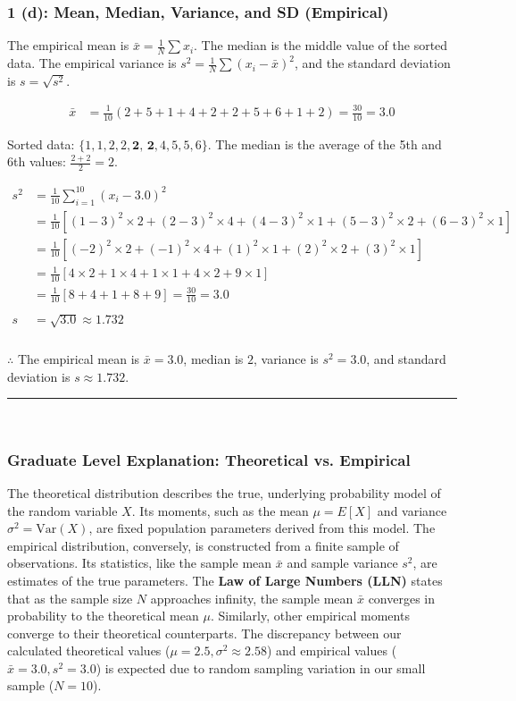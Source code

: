 \documentclass{article}
\begin{document}
\subsubsection*{1 (d): Mean, Median, Variance, and SD (Empirical)}
\parbox{\textwidth}{The empirical mean is $\bar{x} = \frac{1}{N}\sum x_i$. The median is the middle value of the sorted data. The empirical variance is $s^2 = \frac{1}{N}\sum(x_i - \bar{x})^2$, and the standard deviation is $s = \sqrt{s^2}$.}
\begin{align*}
\bar{x} &= \frac{1}{10}(2+5+1+4+2+2+5+6+1+2) = \frac{30}{10} = 3.0
\end{align*}
\parbox{\textwidth}{Sorted data: $\{1, 1, 2, 2, \textbf{2, 2}, 4, 5, 5, 6\}$. The median is the average of the 5th and 6th values: $\frac{2+2}{2} = 2$.}
\begin{align*}
s^2 &= \frac{1}{10}\sum_{i=1}^{10}(x_i - 3.0)^2 \\
&= \frac{1}{10}\left[(1-3)^2 \times 2 + (2-3)^2 \times 4 + (4-3)^2 \times 1 + (5-3)^2 \times 2 + (6-3)^2 \times 1\right] \\
&= \frac{1}{10}\left[(-2)^2 \times 2 + (-1)^2 \times 4 + (1)^2 \times 1 + (2)^2 \times 2 + (3)^2 \times 1\right] \\
&= \frac{1}{10}\left[4 \times 2 + 1 \times 4 + 1 \times 1 + 4 \times 2 + 9 \times 1\right] \\
&= \frac{1}{10}\left[8 + 4 + 1 + 8 + 9\right] = \frac{30}{10} = 3.0 \\
\\
s &= \sqrt{3.0} \approx 1.732
\end{align*}
\subsubsection*{\normalfont}{$\therefore$ The empirical mean is $\bar{x}=3.0$, median is $2$, variance is $s^2=3.0$, and standard deviation is $s \approx 1.732$.}


\noindent\rule{\textwidth}{0.4pt}\\

\newpage

\subsubsection*{\normalfont\bf{Graduate Level Explanation: Theoretical vs. Empirical}}
\parbox{\textwidth}{The theoretical distribution describes the true, underlying probability model of the random variable $X$. Its moments, such as the mean $\mu = E[X]$ and variance $\sigma^2 = \text{Var}(X)$, are fixed population parameters derived from this model. The empirical distribution, conversely, is constructed from a finite sample of observations. Its statistics, like the sample mean $\bar{x}$ and sample variance $s^2$, are estimates of the true parameters. The \textbf{Law of Large Numbers (LLN)} states that as the sample size $N$ approaches infinity, the sample mean $\bar{x}$ converges in probability to the theoretical mean $\mu$. Similarly, other empirical moments converge to their theoretical counterparts. The discrepancy between our calculated theoretical values ($\mu=2.5, \sigma^2 \approx 2.58$) and empirical values ($\bar{x}=3.0, s^2=3.0$) is expected due to random sampling variation in our small sample ($N=10$).}
\end{document}
